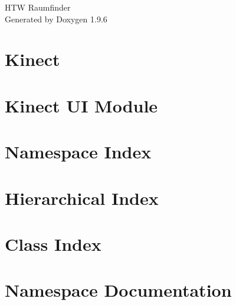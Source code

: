 \documentclass[twoside]{book}
\newcommand{\+}{\discretionary{\mbox{\scriptsize$\hookleftarrow$}}{}{}}
\newcommand{\clearemptydoublepage}{%
    \newpage{\pagestyle{empty}\cleardoublepage}%
  }
\begin{document}
  \raggedbottom
    \hypersetup{pageanchor=false,
                bookmarksnumbered=true,
                pdfencoding=unicode
               }
  \begin{titlepage}
  \vspace*{7cm}
  \begin{center}%
  {\Large HTW Raumfinder}\\
  \vspace*{1cm}
  {\large Generated by Doxygen 1.9.6}\\
  \end{center}
  \end{titlepage}
  \clearemptydoublepage
  \tableofcontents
  \clearemptydoublepage
  \hypersetup{pageanchor=true}
\chapter{Kinect}
\label{md__c___users__basti__documents_raumfinder_htw__assets__kinect__r_e_a_d_m_e}

\chapter{Kinect UI Module}
\label{md__c___users__basti__documents_raumfinder_htw__assets__kinect_u_i_module__r_e_a_d_m_e}

\chapter{Namespace Index}

\chapter{Hierarchical Index}

\chapter{Class Index}

\chapter{Namespace Documentation}










\end{document}
